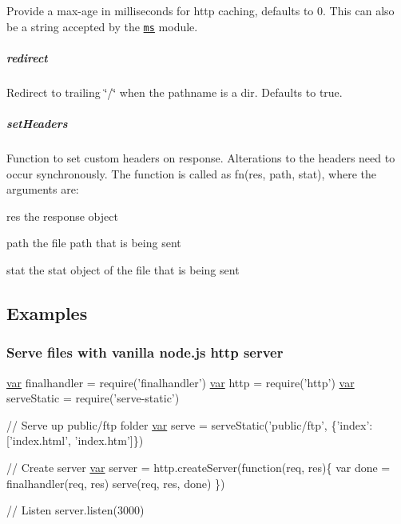 Provide a max-\/age in milliseconds for http caching, defaults to 0. This can also be a string accepted by the \href{https://www.npmjs.org/package/ms#readme}{\tt ms} module.

\subparagraph*{redirect}

Redirect to trailing \char`\"{}/\char`\"{} when the pathname is a dir. Defaults to {\ttfamily true}.

\subparagraph*{set\+Headers}

Function to set custom headers on response. Alterations to the headers need to occur synchronously. The function is called as {\ttfamily fn(res, path, stat)}, where the arguments are\+:


\begin{DoxyItemize}
\item {\ttfamily res} the response object
\item {\ttfamily path} the file path that is being sent
\item {\ttfamily stat} the stat object of the file that is being sent
\end{DoxyItemize}

\subsection*{Examples}

\subsubsection*{Serve files with vanilla node.\+js http server}


\begin{DoxyCode}
\hyperlink{018__def_8c_a335628f2e9085305224b4f9cc6e95ed5}{var} finalhandler = require(\textcolor{stringliteral}{'finalhandler'})
\hyperlink{018__def_8c_a335628f2e9085305224b4f9cc6e95ed5}{var} http = require('http')
\hyperlink{018__def_8c_a335628f2e9085305224b4f9cc6e95ed5}{var} serveStatic = require('serve-static')

\textcolor{comment}{// Serve up public/ftp folder}
\hyperlink{018__def_8c_a335628f2e9085305224b4f9cc6e95ed5}{var} serve = serveStatic('public/ftp', \{\textcolor{stringliteral}{'index'}: [\textcolor{stringliteral}{'index.html'}, \textcolor{stringliteral}{'index.htm'}]\})

\textcolor{comment}{// Create server}
\hyperlink{018__def_8c_a335628f2e9085305224b4f9cc6e95ed5}{var} server = http.createServer(\textcolor{keyword}{function}(req, res)\{
  var done = finalhandler(req, res)
  serve(req, res, done)
\})

\textcolor{comment}{// Listen}
server.listen(3000)
\end{DoxyCode}


